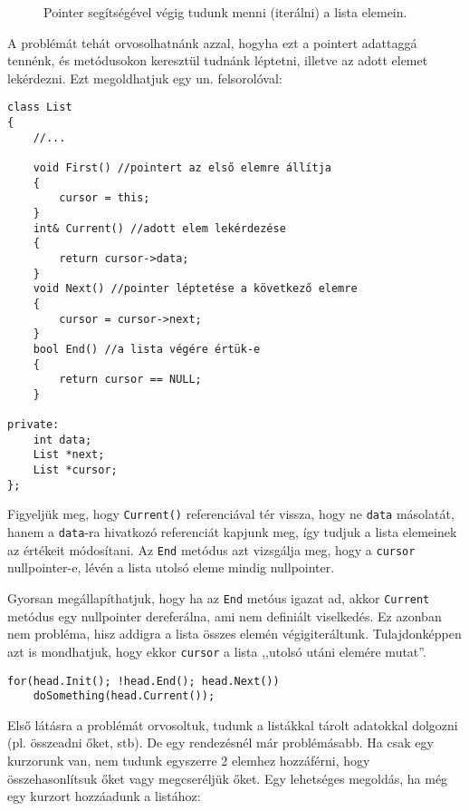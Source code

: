 \documentclass[a4paper,11.5pt,table]{article}
\begin{document}
\begin{figure}[h]
		\smallskip
		
		Pointer segítségével végig tudunk menni (iterálni) a lista elemein.
	\end{figure}
	A problémát tehát orvosolhatnánk azzal, hogyha ezt a pointert adattaggá tennénk, és metódusokon keresztül tudnánk léptetni, illetve az adott elemet lekérdezni. Ezt megoldhatjuk egy un. felsorolóval:
\begin{lstlisting}
class List
{
	//...
	
	void First() //pointert az első elemre állítja
	{
		cursor = this;
	}
	int& Current() //adott elem lekérdezése
	{
		return cursor->data;
	}
	void Next() //pointer léptetése a következő elemre
	{
		cursor = cursor->next;
	}	
	bool End() //a lista végére értük-e
	{
		return cursor == NULL;
	}
	
private:
	int data;
	List *next;
	List *cursor;
};
\end{lstlisting}
	Figyeljük meg, hogy \texttt{Current()} referenciával tér vissza, hogy ne \texttt{data} másolatát, hanem a \texttt{data}-ra hivatkozó referenciát kapjunk meg, így tudjuk a lista elemeinek az értékeit módosítani. Az \texttt{End} metódus azt vizsgálja meg, hogy a \texttt{cursor} nullpointer-e, lévén a lista utolsó eleme mindig nullpointer.
	\begin{note}
		Gyorsan megállapíthatjuk, hogy ha az \texttt{End} metóus igazat ad, akkor \texttt{Current} metódus egy nullpointer dereferálna, ami nem definiált viselkedés. Ez azonban nem probléma, hisz addigra a lista összes elemén végigiteráltunk. Tulajdonképpen azt is mondhatjuk, hogy ekkor \texttt{cursor} a lista ,,utolsó utáni elemére mutat''. 
	\end{note}
\begin{lstlisting}
for(head.Init(); !head.End(); head.Next())
	doSomething(head.Current());
\end{lstlisting}
	Első látásra a problémát orvosoltuk, tudunk a listákkal tárolt adatokkal dolgozni (pl. összeadni őket, stb). De egy rendezésnél már problémásabb. Ha csak egy kurzorunk van, nem tudunk egyszerre 2 elemhez hozzáférni, hogy összehasonlítsuk őket vagy megcseréljük őket. Egy lehetséges megoldás, ha még egy kurzort hozzáadunk a listához:
\end{document}
